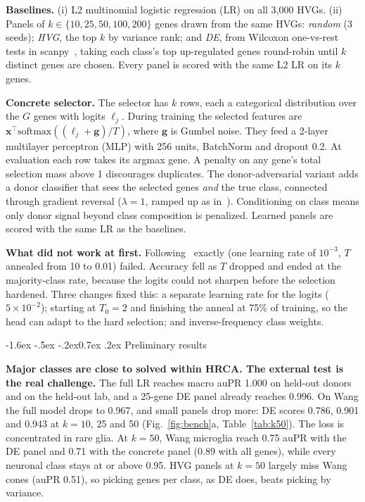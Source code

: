 \documentclass[11pt]{article}
\makeatletter
\renewcommand\section{\@startsection{section}{1}{\z@}%
    {-1.6ex \@plus -.5ex \@minus -.2ex}{0.7ex \@plus .2ex}%
    {\normalfont\large\bfseries}}
\makeatother
\begin{document}
\textbf{Baselines.} (i) L2 multinomial logistic regression (LR) on all 3{,}000 HVGs.
(ii) Panels of $k\in\{10,25,50,100,200\}$ genes drawn from the same HVGs: \emph{random}
(3 seeds); \emph{HVG}, the top $k$ by variance rank; and \emph{DE}, from Wilcoxon one-vs-rest
tests in scanpy~\cite{wolf2018}, taking each class's top up-regulated genes round-robin until
$k$ distinct genes are chosen. Every panel is scored with the same L2 LR on its $k$ genes.

\textbf{Concrete selector.} The selector has $k$ rows, each a categorical distribution over
the $G$ genes with logits $\boldsymbol\ell_j$. During training the selected features are
$\mathbf{x}^\top\mathrm{softmax}((\boldsymbol\ell_j+\mathbf{g})/T)$, where $\mathbf{g}$ is
Gumbel noise. They feed a 2-layer multilayer perceptron (MLP) with 256 units, BatchNorm and
dropout 0.2. At evaluation each row takes its argmax gene. A penalty on any gene's total
selection mass above 1 discourages duplicates. The donor-adversarial variant adds a donor
classifier that sees the selected genes \emph{and} the true class, connected through
gradient reversal ($\lambda=1$, ramped up as in~\cite{ganin2016}). Conditioning on class
means only donor signal beyond class composition is penalized. Learned panels are scored
with the same LR as the baselines.

\textbf{What did not work at first.} Following~\cite{abid2019} exactly (one learning rate of
$10^{-3}$, $T$ annealed from 10 to 0.01) failed. Accuracy fell as $T$ dropped and ended at
the majority-class rate, because the logits could not sharpen before the selection hardened.
Three changes fixed this: a separate learning rate for the logits ($5\times10^{-2}$);
starting at $T_0=2$ and finishing the anneal at 75\% of training, so the head can adapt to
the hard selection; and inverse-frequency class weights.

\section{Preliminary results}

\textbf{Major classes are close to solved within HRCA. The external test is the real
challenge.} The full LR reaches macro auPR 1.000 on held-out donors and on the held-out lab,
and a 25-gene DE panel already reaches 0.996. On Wang the full model drops to 0.967, and
small panels drop more: DE scores 0.786, 0.901 and 0.943 at $k=10$, 25 and 50
(Fig.~\ref{fig:bench}a, Table~\ref{tab:k50}). The loss is concentrated in rare glia. At
$k=50$, Wang microglia reach 0.75 auPR with the DE panel and 0.71 with the concrete panel
(0.89 with all genes), while every neuronal class stays at or above 0.95. HVG panels at
$k=50$ largely miss Wang cones (auPR 0.51), so picking genes per class, as DE does, beats
picking by variance.
\end{document}
